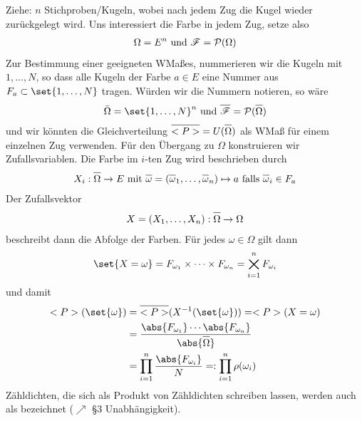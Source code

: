 Ziehe: $n$ Stichproben/Kugeln, wobei nach jedem Zug die Kugel wieder zurückgelegt wird. Uns interessiert die Farbe in jedem Zug, setze also
\begin{align}
	\Omega = E^n \text{ und } \mathscr{F} = \mathcal{P}(\Omega) \notag
\end{align}
Zur Bestimmung einer geeigneten WMaßes, nummerieren wir die Kugeln mit $1,\dots, N$, so dass alle Kugeln der Farbe $a \in E$ eine Nummer aus $F_{a} \subset \set{1,\dots, N}$ tragen. Würden wir die Nummern notieren, so wäre
\begin{align}
	\overline{\Omega} = \set{1,\dots, N}^n \und \overline{\sigF} = \pows(\overline{\Omega})\notag
\end{align}
und wir könnten die Gleichverteilung $\overline{\probp} = U(\overline{\Omega})$ als WMaß für einem einzelnen Zug verwenden. Für den Übergang zu $\Omega$ konstruieren wir  Zufallsvariablen. Die Farbe im $i$-ten Zug wird beschrieben durch
\begin{align}
	X_i: \overline{\Omega} \to E \mit \overline{\omega} = \left( \overline{\omega}_1, \dots, \overline{\omega}_n \right) \mapsto a \text{ falls } \overline{\omega}_i \in F_a\notag
\end{align}
Der Zufallsvektor
\begin{align}
	X = (X_1, \dots, X_n): \overline{\Omega} \to \Omega\notag
\end{align}
beschreibt dann die Abfolge der Farben. Für jedes $\omega \in \Omega$ gilt dann
\begin{align}
	\set{X = \omega} = F_{\omega_1} \times \cdots \times F_{\omega_n} = \bigtimes_{i=1}^{n} F_{\omega_i}\notag
\end{align}
und damit
\begin{align}
	\probp(\set{\omega}) 
	&= \overline{\probp}(X^{-1}(\set{\omega})) = \probp(X=\omega)\notag\\
	&= \frac{\abs{F_{\omega_1}} \cdots \abs{F_{\omega_n}}}{\abs{\overline{\Omega}}}\notag\\
	&= \prod_{i=1}^{n} \frac{\abs{F_{\omega_i}}}{N} =: \prod_{i=1}^{n} \rho(\omega_i)\notag
\end{align}
Zähldichten, die sich als Produkt von Zähldichten schreiben lassen, werden auch als  bezeichnet ($\nearrow$  \S 3 Unabhängigkeit). %

